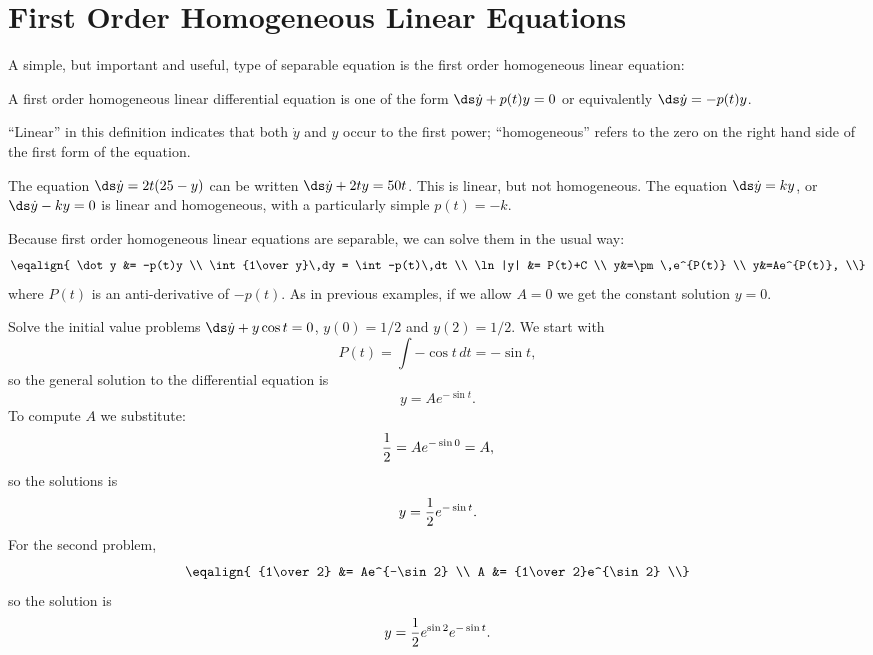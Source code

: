 \section{First Order Homogeneous Linear Equations}{}{}
\nobreak
A simple, but important and useful, type of separable equation is the
{\dfont first order homogeneous linear equation\/}:

\begin{definition} A first order homogeneous linear differential equation
is one of
the form $\ds \dot y + p(t)y=0$
or equivalently
$\ds \dot y = -p(t)y$.
\end{definition}

``Linear'' in this definition indicates that both $\dot y$ and $y$
occur to the first power; ``homogeneous'' refers to the zero on the
right hand side of the first form of the equation.

\begin{example} The equation $\ds \dot y = 2t(25-y)$ can be written
$\ds \dot y + 2ty= 50t$. This is linear, but not homogeneous. The
equation $\ds \dot y=ky$, or $\ds \dot y-ky=0$ is linear and
homogeneous, with a particularly simple $p(t)=-k$.
\end{example}

Because first order homogeneous linear equations are separable, we can
solve them in the usual way:
$$\eqalign{
\dot y &= -p(t)y \\
\int {1\over y}\,dy = \int -p(t)\,dt \\
\ln|y| &= P(t)+C \\
y&=\pm\,e^{P(t)} \\
y&=Ae^{P(t)}, \\}
$$
where $P(t)$ is an anti-derivative of $-p(t)$. As in previous
examples, if we allow $A=0$ we get the constant solution $y=0$.

\begin{example} Solve the initial value problems $\ds \dot y + y\cos t =0$,
$y(0)=1/2$ and $y(2)=1/2$. We start with
$$P(t)=\int -\cos t\,dt = -\sin t,$$
so the general solution to the differential equation is
$$y=Ae^{-\sin t}.$$
To compute $A$ we substitute:
$$ {1\over 2} = Ae^{-\sin 0} = A,$$
so the solutions is 
$$ y = {1\over 2} e^{-\sin t}.$$
For the second problem,
$$ \eqalign{
{1\over 2} &= Ae^{-\sin 2} \\
A &= {1\over 2}e^{\sin 2} \\}
$$
so the solution is 
$$ y = {1\over 2}e^{\sin 2}e^{-\sin t}.$$
\vskip-15pt\end{example}

